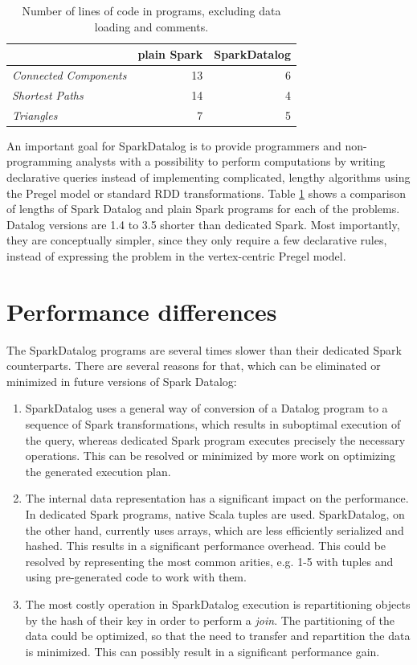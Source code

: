 \begin{table}[!htbp]
  \centering
\begin{tabular}{|l|r|r|}
\hline   & \textbf{plain Spark} & \textbf{SparkDatalog} \\ 
\hline
 \textit{Connected Components} & 13 & 6 \\ 
 \textit{Shortest Paths} & 14 & 4 \\ 
 \textit{Triangles} & 7 & 5 \\ 
\hline 
\end{tabular} 
\caption{Number of lines of code in programs, excluding data loading and comments.}
\label{tab_proglen}
\end{table}

An important goal for SparkDatalog is to provide programmers and non-programming analysts with a possibility to perform computations by writing declarative queries instead of implementing complicated, lengthy algorithms using the Pregel model or standard RDD transformations. Table \ref{tab_proglen} shows a comparison of lengths of Spark Datalog and plain Spark programs for each of the problems. Datalog versions are 1.4 to 3.5 shorter than dedicated Spark. Most importantly, they are conceptually simpler, since they only require a few declarative rules, instead of expressing the problem in the vertex-centric Pregel model.

\section{Performance differences}\label{s:whyslow}
The SparkDatalog programs are several times slower than their dedicated Spark counterparts. There are several reasons for that, which can be eliminated or minimized in future versions of Spark Datalog:
\begin{enumerate}
\item SparkDatalog uses a general way of conversion of a Datalog program to a sequence of Spark transformations, which results in suboptimal execution of the query, whereas dedicated Spark program executes precisely the necessary operations. This can be resolved or minimized by more work on optimizing the generated execution plan.
\item The internal data representation has a significant impact on the performance. In dedicated Spark programs, native Scala tuples are used. SparkDatalog, on the other hand, currently uses arrays, which are less efficiently serialized and hashed. This results in a significant performance overhead. This could be resolved by representing the most common arities, e.g. 1-5 with tuples and using pre-generated code to work with them.
\item The most costly operation in SparkDatalog execution is repartitioning objects by the hash of their key in order to perform a \emph{join}. The partitioning of the data could be optimized, so that the need to transfer and repartition the data is minimized. This can possibly result in a significant performance gain.
\end{enumerate}


